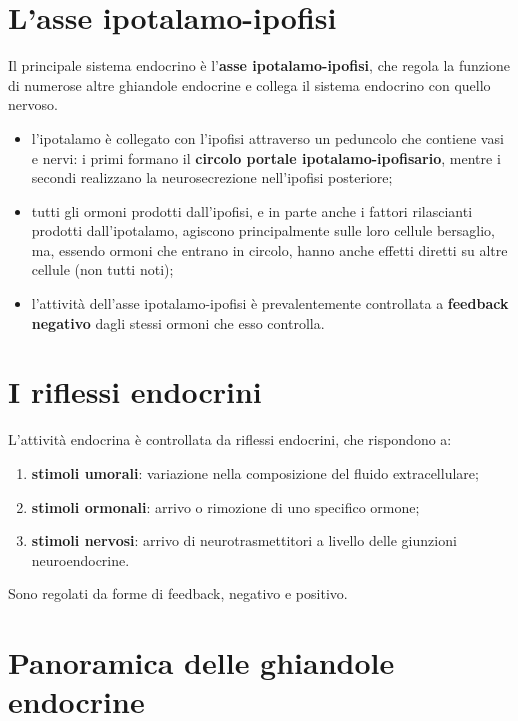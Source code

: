 \section{L'asse ipotalamo-ipofisi}

Il principale sistema endocrino è l'\textbf{asse ipotalamo-ipofisi}, che
regola la funzione di numerose altre ghiandole endocrine e collega il
sistema endocrino con quello nervoso.

\begin{itemize}
  \item l'ipotalamo è collegato con l'ipofisi attraverso un peduncolo che
    contiene vasi e nervi: i primi formano il \textbf{circolo portale
    ipotalamo-ipofisario}, mentre i secondi realizzano la neurosecrezione
    nell'ipofisi posteriore;
  \item tutti gli ormoni prodotti dall'ipofisi, e in parte anche i fattori
    rilascianti prodotti dall'ipotalamo, agiscono principalmente sulle loro
    cellule bersaglio, ma, essendo ormoni che entrano in circolo, hanno anche
    effetti diretti su altre cellule (non tutti noti);
  \item l'attività dell'asse ipotalamo-ipofisi è prevalentemente controllata
    a \textbf{feedback negativo} dagli stessi ormoni che esso controlla.
\end{itemize}

\section{I riflessi endocrini}

L'attività endocrina è controllata da riflessi endocrini, che rispondono a:
\begin{enumerate}
  \item \textbf{stimoli umorali}: variazione nella composizione del fluido
    extracellulare;
  \item \textbf{stimoli ormonali}: arrivo o rimozione di uno specifico
    ormone;
  \item \textbf{stimoli nervosi}: arrivo di neurotrasmettitori a livello
    delle giunzioni neuroendocrine.
\end{enumerate}
Sono regolati da forme di feedback, negativo e positivo.

\section{Panoramica delle ghiandole endocrine}

